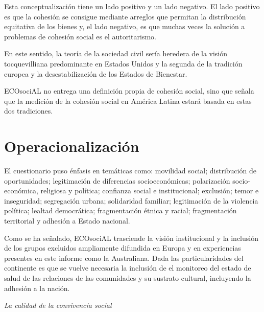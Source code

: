 \documentclass[
  12pt,
]{book}
\begin{document}
Esta conceptualización tiene un lado positivo y un lado negativo. El
lado positivo es que la cohesión se consigue mediante arreglos que
permitan la distribución equitativa de los bienes y, el lado negativo,
es que muchas veces la solución a problemas de cohesión social es el
autoritarismo.

En este sentido, la teoría de la sociedad civil sería heredera de la
visión tocquevilliana predominante en Estados Unidos y la segunda de la
tradición europea y la desestabilización de los Estados de Bienestar.
\citep{somma2015paradojas}

ECOsociAL no entrega una definición propia de cohesión social, sino que
señala que la medición de la cohesión social en América Latina estará
basada en estas dos tradiciones.

\hypertarget{operacionalizaciuxf3n-4}{%
\section{Operacionalización}\label{operacionalizaciuxf3n-4}}

El cuestionario puso énfasis en temáticas como: movilidad social;
distribución de oportunidades; legitimación de diferencias
socioeconómicas; polarización socio-económica, religiosa y política;
confianza social e institucional; exclusión; temor e inseguridad;
segregación urbana; solidaridad familiar; legitimación de la violencia
política; lealtad democrática; fragmentación étnica y racial;
fragmentación territorial y adhesión a Estado nacional.

Como se ha señalado, ECOsociAL trasciende la visión institucional y la
inclusión de los grupos excluidos ampliamente difundida en Europa y en
experiencias presentes en este informe como la Australiana. Dada las
particularidades del continente es que se vuelve necesaria la inclusión
de el monitoreo del estado de salud de las relaciones de las comunidades
y su sustrato cultural, incluyendo la adhesión a la nación.

\emph{La calidad de la convivencia social}
\end{document}
